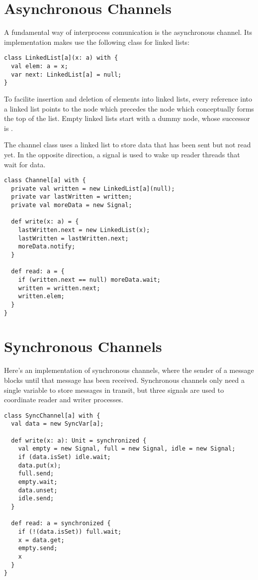 \documentclass[11pt]{report}
\begin{document}
\section{Asynchronous Channels}

A fundamental way of interprocess comunication is the asynchronous
channel. Its implementation makes use the following class for linked
lists:
\begin{verbatim}
class LinkedList[a](x: a) with {
  val elem: a = x;
  var next: LinkedList[a] = null;
}
\end{verbatim}
To facilite insertion and deletion of elements into linked lists,
every reference into a linked list points to the node which precedes
the node which conceptually forms the top of the list.
Empty linked lists start with a dummy node, whose successor is \verb@null@.

The channel class uses a linked list to store data that has been sent
but not read yet. In the opposite direction, a signal \verb@moreData@ is
used to wake up reader threads that wait for data.
\begin{verbatim}
class Channel[a] with {
  private val written = new LinkedList[a](null);
  private var lastWritten = written;
  private val moreData = new Signal;

  def write(x: a) = {
    lastWritten.next = new LinkedList(x);
    lastWritten = lastWritten.next;
    moreData.notify;
  }

  def read: a = {
    if (written.next == null) moreData.wait;
    written = written.next;
    written.elem;
  }
}
\end{verbatim}

\section{Synchronous Channels}

Here's an implementation of synchronous channels, where the sender of
a message blocks until that message has been received. Synchronous
channels only need a single variable to store messages in transit, but
three signals are used to coordinate reader and writer processes.
\begin{verbatim}
class SyncChannel[a] with {
  val data = new SyncVar[a];

  def write(x: a): Unit = synchronized {
    val empty = new Signal, full = new Signal, idle = new Signal;
    if (data.isSet) idle.wait;
    data.put(x);
    full.send;
    empty.wait;
    data.unset;
    idle.send;
  }

  def read: a = synchronized {
    if (!(data.isSet)) full.wait;
    x = data.get;
    empty.send;
    x
  }
}
\end{verbatim}
\end{document}
